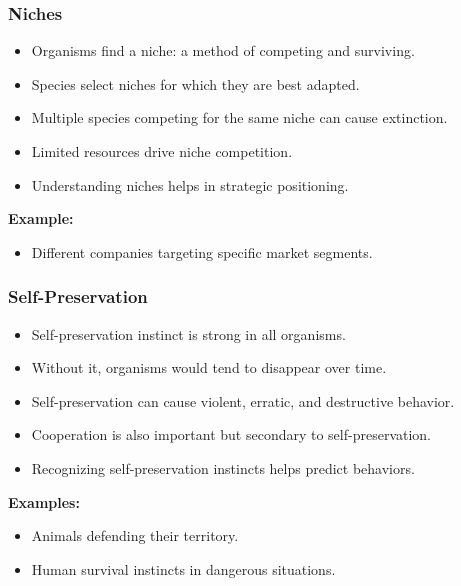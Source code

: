 \begin{frame}[fragile]\frametitle{Niches}
\begin{itemize}
    \item Organisms find a niche: a method of competing and surviving.
    \item Species select niches for which they are best adapted.
    \item Multiple species competing for the same niche can cause extinction.
    \item Limited resources drive niche competition.
    \item Understanding niches helps in strategic positioning.
\end{itemize}
\textbf{Example:}
\begin{itemize}
    \item Different companies targeting specific market segments.
\end{itemize}
\end{frame}

\begin{frame}[fragile]\frametitle{Self-Preservation}
\begin{itemize}
    \item Self-preservation instinct is strong in all organisms.
    \item Without it, organisms would tend to disappear over time.
    \item Self-preservation can cause violent, erratic, and destructive behavior.
    \item Cooperation is also important but secondary to self-preservation.
    \item Recognizing self-preservation instincts helps predict behaviors.
\end{itemize}
\textbf{Examples:}
\begin{itemize}
    \item Animals defending their territory.
    \item Human survival instincts in dangerous situations.
\end{itemize}
\end{frame}

